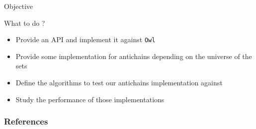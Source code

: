 \documentclass[10pt]{beamer}
\begin{document}
\begin{frame}{Objective}{}
    \begin{block}{What to do ?}
        \begin{itemize}
            \item Provide an API and implement it against \texttt{Owl}
            \item Provide some implementation for antichains depending
            on the universe of the sets
            \item Define the algorithms to test our antichains
            implementation against
            \item Study the performance of those implementations
        \end{itemize}

    \end{block}
\end{frame}



{\aauwavesbg
\begin{frame}[allowframebreaks]
    \frametitle{References}


\end{frame}}

{\aauwavesbg
\begin{frame}
\end{frame}}
\end{document}
